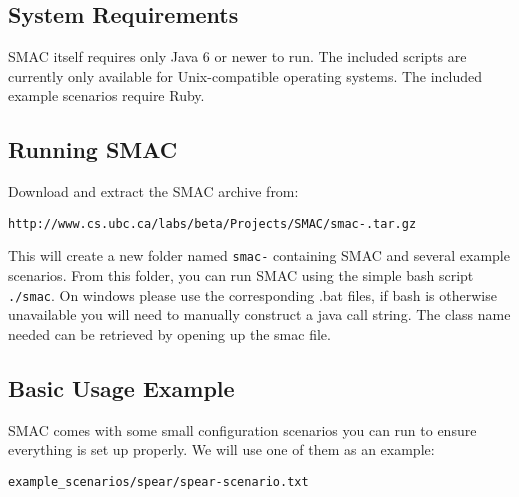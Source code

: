 \documentclass[11pt,letterpaper,twoside]{article}
\begin{document}
\subsection{System Requirements}

SMAC itself requires only Java 6 or newer to run. The included scripts are currently only available for Unix-compatible operating systems. The included example scenarios require Ruby. 

\subsection{Running SMAC}

Download and extract the SMAC archive from:

{\footnotesize
\begin{alltt}
http://www.cs.ubc.ca/labs/beta/Projects/SMAC/smac-\version{}\unskip.tar.gz
\end{alltt}}

This will create a new folder named \texttt{smac-\version} containing SMAC and several example scenarios. 
From this folder, you can run SMAC using the simple bash script \texttt{./smac}.  On windows please use the corresponding .bat files, if bash is otherwise unavailable you will need to manually construct a java call string. The class name needed can be retrieved by opening up the smac file.


\subsection{Basic Usage Example}

SMAC comes with some small configuration scenarios you can run to ensure everything is set up properly.
We will use one of them as an example:

{\footnotesize
\begin{alltt}
example_scenarios/spear/spear-scenario.txt
\end{alltt}}
\end{document}

